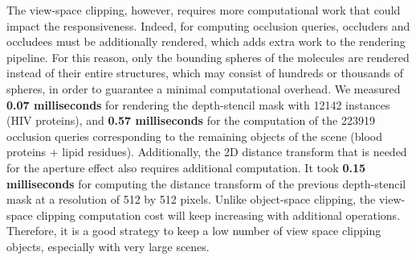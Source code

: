 The view-space clipping, however, requires more computational work that could impact the responsiveness. 
Indeed, for computing occlusion queries, occluders and occludees must be additionally rendered, which adds extra work to the rendering pipeline. 
For this reason, only the bounding spheres of the molecules are rendered instead of their entire structures, which may consist of hundreds or thousands of spheres, in order to guarantee a minimal computational overhead. 
We measured \textbf{0.07 milliseconds} for rendering the depth-stencil mask with 12142 instances (HIV proteins), and \textbf{0.57 milliseconds} for the computation of the 223919 occlusion queries corresponding to the remaining objects of the scene (blood proteins + lipid residues).
Additionally, the 2D distance transform that is needed for the aperture effect also requires additional computation.
It took \textbf{0.15 milliseconds} for computing the distance transform of the previous depth-stencil mask at a resolution of 512 by 512 pixels.
Unlike object-space clipping, the view-space clipping computation cost will keep increasing with additional operations.
Therefore, it is a good strategy to keep a low number of view space clipping objects, especially with very large scenes.







